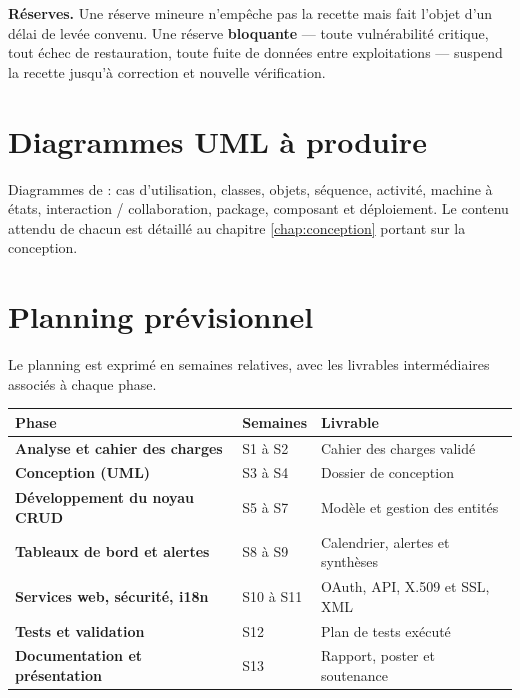 \begin{encadre}
\textbf{Réserves.} Une réserve mineure n'empêche pas la recette mais fait
l'objet d'un délai de levée convenu. Une réserve \textbf{bloquante} --- toute
vulnérabilité critique, tout échec de restauration, toute fuite de données entre
exploitations --- suspend la recette jusqu'à correction et nouvelle vérification.
\end{encadre}

\section{Diagrammes UML à produire}
Diagrammes de : cas d'utilisation, classes, objets, séquence, activité, machine
à états, interaction / collaboration, package, composant et déploiement. Le
contenu attendu de chacun est détaillé au chapitre \ref{chap:conception} portant
sur la conception.

\section{Planning prévisionnel}
Le planning est exprimé en semaines relatives, avec les livrables intermédiaires
associés à chaque phase.
\begin{xltabular}{\textwidth}{>{\bfseries}p{4.5cm} C{2.2cm} X}
\toprule
\textbf{Phase} & \textbf{Semaines} & \textbf{Livrable} \\
\midrule
\endhead
Analyse et cahier des charges & S1 à S2 & Cahier des charges validé \\
Conception (UML) & S3 à S4 & Dossier de conception \\
Développement du noyau CRUD & S5 à S7 & Modèle et gestion des entités \\
Tableaux de bord et alertes & S8 à S9 & Calendrier, alertes et synthèses \\
Services web, sécurité, i18n & S10 à S11 & OAuth, API, X.509 et SSL, XML \\
Tests et validation & S12 & Plan de tests exécuté \\
Documentation et présentation & S13 & Rapport, poster et soutenance \\
\bottomrule
\end{xltabular}

